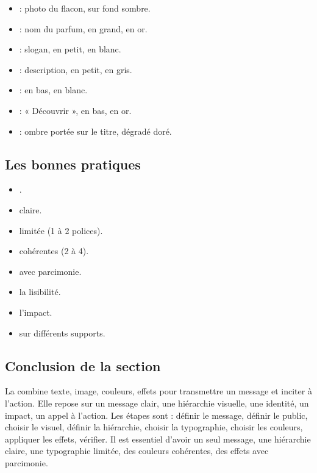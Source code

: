 \begin{itemize}
    \item {} : photo du flacon, sur fond sombre.
    \item {} : nom du parfum, en grand, en or.
    \item {} : slogan, en petit, en blanc.
    \item {} : description, en petit, en gris.
    \item {} : en bas, en blanc.
    \item {} : « Découvrir », en bas, en or.
    \item {} : ombre portée sur le titre, dégradé doré.
\end{itemize}

\subsection{Les bonnes pratiques}

\begin{itemize}
    \item {}.
    \item {} claire.
    \item {} limitée (1 à 2 polices).
    \item {} cohérentes (2 à 4).
    \item {} avec parcimonie.
    \item {} la lisibilité.
    \item {} l'impact.
    \item {} sur différents supports.
\end{itemize}

\subsection*{Conclusion de la section}

La  combine texte, image, couleurs, effets pour transmettre un message et inciter à l'action. Elle repose sur un message clair, une hiérarchie visuelle, une identité, un impact, un appel à l'action. Les étapes sont : définir le message, définir le public, choisir le visuel, définir la hiérarchie, choisir la typographie, choisir les couleurs, appliquer les effets, vérifier. Il est essentiel d'avoir un seul message, une hiérarchie claire, une typographie limitée, des couleurs cohérentes, des effets avec parcimonie.

